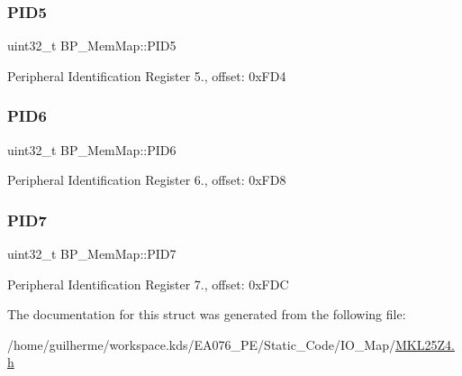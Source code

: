 \subsubsection{\texorpdfstring{P\+I\+D5}{PID5}}
{\footnotesize\ttfamily uint32\+\_\+t B\+P\+\_\+\+Mem\+Map\+::\+P\+I\+D5}

Peripheral Identification Register 5., offset\+: 0x\+F\+D4 \mbox{\label{struct_b_p___mem_map_a9f611c760b2dc672f72485a6751ae703}} 
\subsubsection{\texorpdfstring{P\+I\+D6}{PID6}}
{\footnotesize\ttfamily uint32\+\_\+t B\+P\+\_\+\+Mem\+Map\+::\+P\+I\+D6}

Peripheral Identification Register 6., offset\+: 0x\+F\+D8 \mbox{\label{struct_b_p___mem_map_a60dff3ca8ab0f81ef166fffd7fbc3356}} 
\subsubsection{\texorpdfstring{P\+I\+D7}{PID7}}
{\footnotesize\ttfamily uint32\+\_\+t B\+P\+\_\+\+Mem\+Map\+::\+P\+I\+D7}

Peripheral Identification Register 7., offset\+: 0x\+F\+DC 

The documentation for this struct was generated from the following file\+:\begin{DoxyCompactItemize}
\item 
/home/guilherme/workspace.\+kds/\+E\+A076\+\_\+\+P\+E/\+Static\+\_\+\+Code/\+I\+O\+\_\+\+Map/\hyperlink{_m_k_l25_z4_8h}{M\+K\+L25\+Z4.\+h}\end{DoxyCompactItemize}
